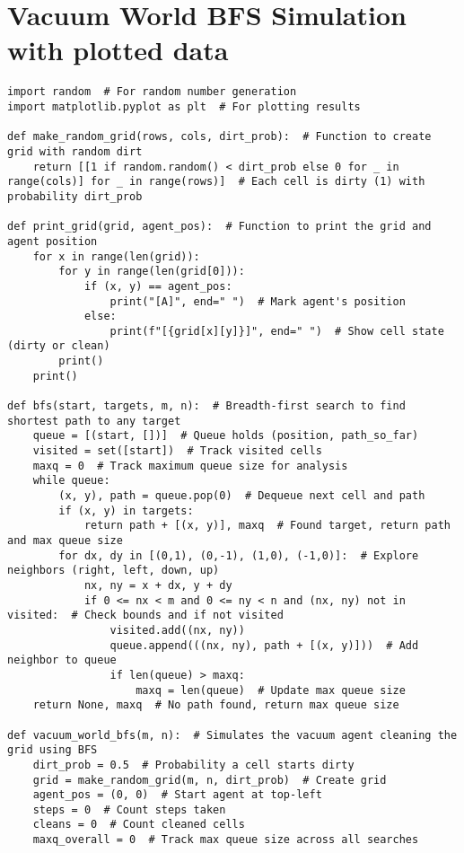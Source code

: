 \documentclass{article}
\begin{document}
\section*{Vacuum World BFS Simulation with plotted data}

\begin{lstlisting}
import random  # For random number generation
import matplotlib.pyplot as plt  # For plotting results

def make_random_grid(rows, cols, dirt_prob):  # Function to create grid with random dirt
    return [[1 if random.random() < dirt_prob else 0 for _ in range(cols)] for _ in range(rows)]  # Each cell is dirty (1) with probability dirt_prob

def print_grid(grid, agent_pos):  # Function to print the grid and agent position
    for x in range(len(grid)):
        for y in range(len(grid[0])):
            if (x, y) == agent_pos:
                print("[A]", end=" ")  # Mark agent's position
            else:
                print(f"[{grid[x][y]}]", end=" ")  # Show cell state (dirty or clean)
        print()
    print()

def bfs(start, targets, m, n):  # Breadth-first search to find shortest path to any target
    queue = [(start, [])]  # Queue holds (position, path_so_far)
    visited = set([start])  # Track visited cells
    maxq = 0  # Track maximum queue size for analysis
    while queue:
        (x, y), path = queue.pop(0)  # Dequeue next cell and path
        if (x, y) in targets:
            return path + [(x, y)], maxq  # Found target, return path and max queue size
        for dx, dy in [(0,1), (0,-1), (1,0), (-1,0)]:  # Explore neighbors (right, left, down, up)
            nx, ny = x + dx, y + dy
            if 0 <= nx < m and 0 <= ny < n and (nx, ny) not in visited:  # Check bounds and if not visited
                visited.add((nx, ny))
                queue.append(((nx, ny), path + [(x, y)]))  # Add neighbor to queue
                if len(queue) > maxq:
                    maxq = len(queue)  # Update max queue size
    return None, maxq  # No path found, return max queue size

def vacuum_world_bfs(m, n):  # Simulates the vacuum agent cleaning the grid using BFS
    dirt_prob = 0.5  # Probability a cell starts dirty
    grid = make_random_grid(m, n, dirt_prob)  # Create grid
    agent_pos = (0, 0)  # Start agent at top-left
    steps = 0  # Count steps taken
    cleans = 0  # Count cleaned cells
    maxq_overall = 0  # Track max queue size across all searches


\end{lstlisting}
\end{document}
